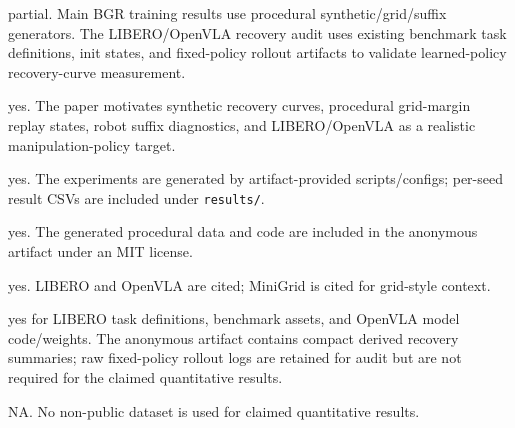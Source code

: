 \documentclass[letterpaper]{article}
\begin{document}
\begin{itemize}

partial. Main BGR training results use procedural synthetic/grid/suffix generators. The LIBERO/OpenVLA recovery audit uses existing benchmark task definitions, init states, and fixed-policy rollout artifacts to validate learned-policy recovery-curve measurement.

\begin{itemize}

	yes. The paper motivates synthetic recovery curves, procedural grid-margin replay states, robot suffix diagnostics, and LIBERO/OpenVLA as a realistic manipulation-policy target.

	yes. The experiments are generated by artifact-provided scripts/configs; per-seed result CSVs are included under \texttt{results/}.

		yes. The generated procedural data and code are included in the anonymous artifact under an MIT license.

	yes. LIBERO and OpenVLA are cited; MiniGrid is cited for grid-style context.

		yes for LIBERO task definitions, benchmark assets, and OpenVLA model code/weights. The anonymous artifact contains compact derived recovery summaries; raw fixed-policy rollout logs are retained for audit but are not required for the claimed quantitative results.

	NA. No non-public dataset is used for claimed quantitative results.

\end{itemize}
\end{itemize}
\end{document}
